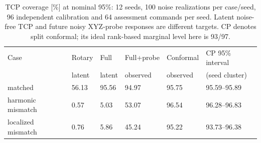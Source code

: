 \begin{table}[H]\centering\small
\begin{tabular}{llllll}\toprule
Case & Rotary & Full & Full+probe & Conformal & CP 95\% interval\\
 & latent & latent & observed & observed & (seed cluster)\\\midrule
matched & 56.13 & 95.56 & 94.97 & 95.75 & 95.59--95.89\\
harmonic mismatch & 0.57 & 5.03 & 53.07 & 96.54 & 96.28--96.83\\
localized mismatch & 0.76 & 5.86 & 45.24 & 95.22 & 93.73--96.38\\
\bottomrule\end{tabular}
\caption{TCP coverage [\%] at nominal 95\%: 12 seeds, 100 noise realizations per case/seed, 96 independent calibration and 64 assessment commands per seed. Latent noise-free TCP and future noisy XYZ-probe responses are different targets. CP denotes split conformal; its ideal rank-based marginal level here is 93/97.}\label{tab:journal_coverage}
\end{table}
